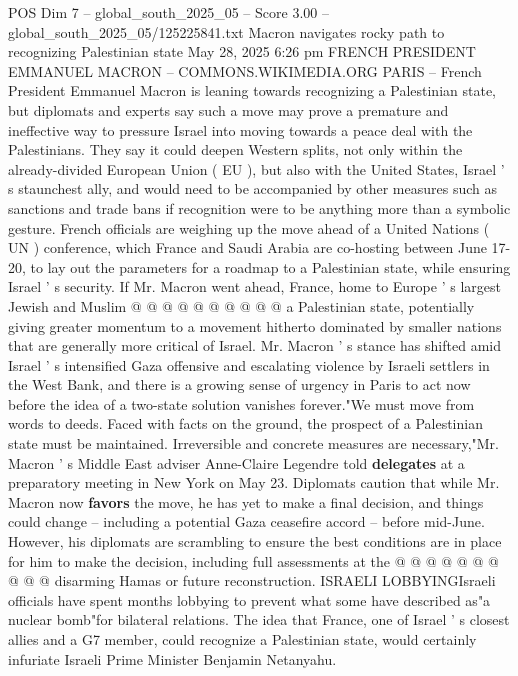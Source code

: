 \begin{textsample}{POS Dim 7 – global\_south\_2025\_05 – Score 3.00 – global\_south\_2025\_05/125225841.txt}  \label{ex:f7_pos_442}
Macron navigates rocky path to recognizing Palestinian state May 28, 2025 6:26 pm FRENCH PRESIDENT EMMANUEL MACRON -- COMMONS.WIKIMEDIA.ORG PARIS -- French President Emmanuel Macron is leaning towards recognizing a Palestinian state, but diplomats and experts say such a move may prove a premature and ineffective way to pressure Israel into moving towards a peace deal with the Palestinians.
They say it could deepen Western splits, not only within the already-divided European Union ( EU ), but also with the United States, Israel ' s staunchest ally, and would need to be accompanied by other measures such as sanctions and trade bans if recognition were to be anything more than a symbolic gesture.
French officials are weighing up the move ahead of a United Nations ( UN ) conference, which France and Saudi Arabia are co-hosting between June 17-20, to lay out the parameters for a roadmap to a Palestinian state, while ensuring Israel ' s security.
If Mr.
Macron went ahead, France, home to Europe ' s largest Jewish and Muslim @ @ @ @ @ @ @ @ @ @ a Palestinian state, potentially giving greater momentum to a movement hitherto dominated by smaller nations that are generally more critical of Israel.
Mr.
Macron ' s stance has shifted amid Israel ' s intensified Gaza offensive and escalating violence by Israeli settlers in the West Bank, and there is a growing sense of urgency in Paris to act now before the idea of a two-state solution vanishes forever."We must move from words to deeds.
Faced with facts on the ground, the prospect of a Palestinian state must be maintained.
Irreversible and concrete measures are necessary,"Mr.
Macron ' s Middle East adviser Anne-Claire Legendre told \textbf{delegates} at a preparatory meeting in New York on May 23.
Diplomats caution that while Mr.
Macron now \textbf{favors} the move, he has yet to make a final decision, and things could change -- including a potential Gaza ceasefire accord -- before mid-June.
However, his diplomats are scrambling to ensure the best conditions are in place for him to make the decision, including full assessments at the @ @ @ @ @ @ @ @ @ @ disarming Hamas or future reconstruction.
ISRAELI LOBBYINGIsraeli officials have spent months lobbying to prevent what some have described as"a nuclear bomb"for bilateral relations.
The idea that France, one of Israel ' s closest allies and a G7 member, could recognize a Palestinian state, would certainly infuriate Israeli Prime Minister Benjamin Netanyahu.

\end{textsample}
